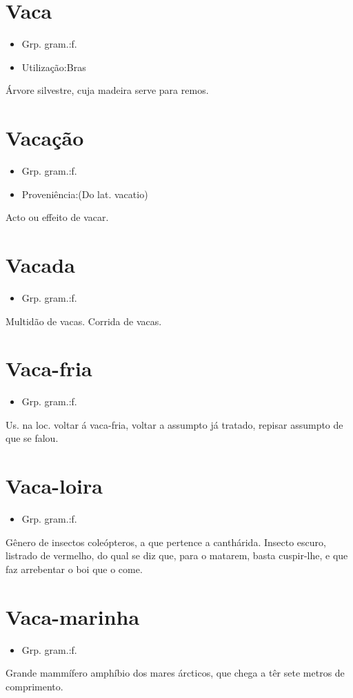 \documentclass{article}
\begin{document}
\section{Vaca}
\begin{itemize}
\item {Grp. gram.:f.}
\end{itemize}
\begin{itemize}
\item {Utilização:Bras}
\end{itemize}
Árvore silvestre, cuja madeira serve para remos.
\section{Vacação}
\begin{itemize}
\item {Grp. gram.:f.}
\end{itemize}
\begin{itemize}
\item {Proveniência:(Do lat. \textunderscore vacatio\textunderscore )}
\end{itemize}
Acto ou effeito de vacar.
\section{Vacada}
\begin{itemize}
\item {Grp. gram.:f.}
\end{itemize}
Multidão de vacas.
Corrida de vacas.
\section{Vaca-fria}
\begin{itemize}
\item {Grp. gram.:f.}
\end{itemize}
Us. na loc. \textunderscore voltar á vaca-fria\textunderscore , voltar a assumpto já tratado, repisar assumpto de que se falou.
\section{Vaca-loira}
\begin{itemize}
\item {Grp. gram.:f.}
\end{itemize}
Gênero de insectos coleópteros, a que pertence a canthárida.
Insecto escuro, listrado de vermelho, do qual se diz que, para o matarem, basta cuspir-lhe, e que faz arrebentar o boi que o come.
\section{Vaca-marinha}
\begin{itemize}
\item {Grp. gram.:f.}
\end{itemize}
Grande mammífero amphíbio dos mares árcticos, que chega a têr sete metros de comprimento.
\end{document}
